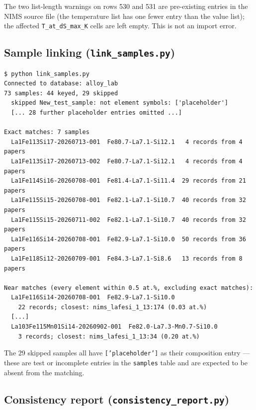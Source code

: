 \documentclass[11pt,a4paper]{article}
\begin{document}
The two list-length warnings on rows 530 and 531 are pre-existing entries
in the NIMS source file (the temperature list has one fewer entry than the
value list); the affected \texttt{T\_at\_dS\_max\_K} cells are left empty.
This is not an import error.

\subsection{Sample linking (\texttt{link\_samples.py})}

\begin{lstlisting}[style=terminal, caption={Sample--literature linking output (abbreviated).}]
$ python link_samples.py
Connected to database: alloy_lab
73 samples: 44 keyed, 29 skipped
  skipped New_test_sample: not element symbols: ['placeholder']
  [... 28 further placeholder entries omitted ...]

Exact matches: 7 samples
  La1Fe113Si17-20260713-001  Fe80.7-La7.1-Si12.1   4 records from 4 papers
  La1Fe113Si17-20260713-002  Fe80.7-La7.1-Si12.1   4 records from 4 papers
  La1Fe114Si16-20260708-001  Fe81.4-La7.1-Si11.4  29 records from 21 papers
  La1Fe115Si15-20260708-001  Fe82.1-La7.1-Si10.7  40 records from 32 papers
  La1Fe115Si15-20260711-002  Fe82.1-La7.1-Si10.7  40 records from 32 papers
  La1Fe116Si14-20260708-001  Fe82.9-La7.1-Si10.0  50 records from 36 papers
  La1Fe118Si12-20260709-001  Fe84.3-La7.1-Si8.6   13 records from 8 papers

Near matches (every element within 0.5 at.%, excluding exact matches):
  La1Fe116Si14-20260708-001  Fe82.9-La7.1-Si10.0
    22 records; closest: nims_lafesi_1_13:174 (0.03 at.%)
  [...]
  La103Fe115Mn01Si14-20260902-001  Fe82.0-La7.3-Mn0.7-Si10.0
    3 records; closest: nims_lafesi_1_13:34 (0.20 at.%)
\end{lstlisting}

The 29 skipped samples all have \texttt{['placeholder']} as their
composition entry — these are test or incomplete entries in the
\texttt{samples} table and are expected to be absent from the matching.

\newpage

\subsection{Consistency report (\texttt{consistency\_report.py})}
\end{document}
